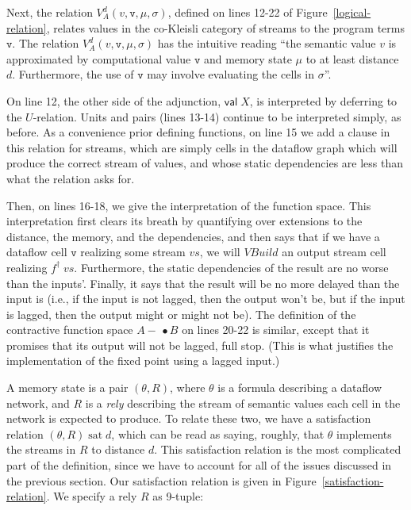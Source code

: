 \documentclass[nocopyrightspace,preprint]{sigplanconf}
\newcommand{\term}[1]{\ensuremath{\mathtt{{#1}}}}
\newcommand{\Build}{\mathit{VBuild}}
\newcommand{\lollishrink}{-\!\!\!\,\bullet}
\newcommand{\valtype}[1]{\mathsf{val}\;{#1}}
\newcommand{\satisfy}[2]{{#1}\;\mathrm{sat}\;{#2}}
\begin{document}
Next, the relation $V^d_A(v, \term{v}, \mu, \sigma)$, defined on lines
12-22 of Figure~\ref{logical-relation}, relates values in the
co-Kleisli category of streams to the program terms \term{v}. The
relation $V^d_A(v, \term{v}, \mu, \sigma)$ has the intuitive reading
``the semantic value $v$ is approximated by computational value
\term{v} and memory state $\mu$ to at least distance $d$. Furthermore,
the use of \term{v} may involve evaluating the cells in $\sigma$''.

On line 12, the other side of the adjunction, $\valtype{X}$, is
interpreted by deferring to the $U$-relation.  Units and pairs (lines
13-14) continue to be interpreted simply, as before.  As a convenience
prior defining functions, on line 15 we add a clause in this relation
for streams, which are simply cells in the dataflow graph which will
produce the correct stream of values, and whose static dependencies
are less than what the relation asks for.

Then, on lines 16-18, we give the interpretation of the function
space.  This interpretation first clears its breath by quantifying
over extensions to the distance, the memory, and the dependencies, and
then says that if we have a dataflow cell \term{v} realizing some
stream $vs$, we will $\Build$ an output stream cell realizing
$f^\dagger\;vs$. Furthermore, the static dependencies of the result
are no worse than the inputs'. Finally, it says that the result will
be no more delayed than the input is (i.e., if the input is not
lagged, then the output won't be, but if the input is lagged, then the
output might or might not be). The definition of the contractive
function space $A \lollishrink B$ on lines 20-22 is similar, except that it
promises that its output will not be lagged, full stop. (This is what
justifies the implementation of the fixed point using a lagged input.)

A memory state is a pair $(\theta, R)$, where $\theta$ is a formula
describing a dataflow network, and $R$ is a \emph{rely} describing the
stream of semantic values each cell in the network is expected to
produce. To relate these two, we have a satisfaction relation
$\satisfy{(\theta, R)}{d}$, which can be read as saying, roughly, that
$\theta$ implements the streams in $R$ to distance $d$. This
satisfaction relation is the most complicated part of the definition,
since we have to account for all of the issues discussed in the
previous section. Our satisfaction relation is given in
Figure~\ref{satisfaction-relation}.
We specify a rely $R$ as 9-tuple:
\end{document}
